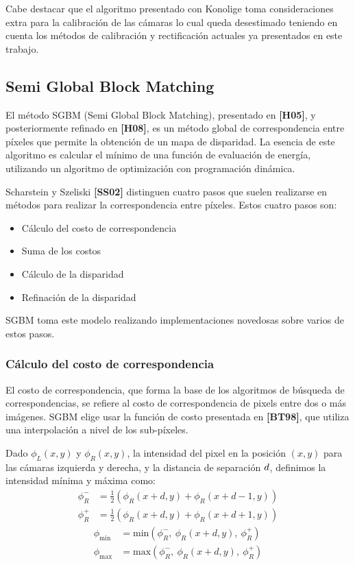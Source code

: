 \documentclass[11pt,a4paper,titlepage]{article}
\newcommand{\Cite}[1]{\textbf{[#1]}}
\newcommand{\Scalar}[1]{\ensuremath{\mathnormal{#1}}}
\begin{document}
Cabe destacar que el algoritmo presentado con Konolige toma consideraciones extra para la calibración de las cámaras lo cual queda desestimado teniendo en cuenta los métodos de calibración y rectificación actuales ya presentados en este trabajo.

\subsection{Semi Global Block Matching}

El método SGBM (Semi Global Block Matching), presentado en \Cite{H05}, y posteriormente refinado en \Cite{H08}, es un método global de correspondencia entre píxeles que permite la obtención de un mapa de disparidad. La esencia de este algoritmo es calcular el mínimo de una función de evaluación de energía, utilizando un algoritmo de optimización con programación dinámica.

Scharstein y Szeliski \Cite{SS02} distinguen cuatro pasos que suelen realizarse en métodos para realizar la correspondencia entre píxeles. Estos cuatro pasos son:
\begin{itemize}
	\item Cálculo del costo de correspondencia
	\item Suma de los costos
	\item Cálculo de la disparidad
	\item Refinación de la disparidad
\end{itemize}

SGBM toma este modelo realizando implementaciones novedosas sobre varios de estos pasos.

\subsubsection{Cálculo del costo de correspondencia}

El costo de correspondencia, que forma la base de los algoritmos de búsqueda de correspondencias, se refiere al costo de correspondencia de pixels entre dos o más imágenes. SGBM elige usar la función de costo presentada en \Cite{BT98}, que utiliza una interpolación a nivel de los sub-píxeles.

Dado $\phi_L(x, y)$ y $\phi_R(x, y)$, la intensidad del pixel en la posición $(x, y)$ para las cámaras izquierda y derecha, y la distancia de separación \Scalar{d}, definimos la intensidad mínima y máxima como:
\begin{align*}
	\phi_R^- &= \frac{1}{2} \left( \phi_R( x + d, y ) + \phi_R( x + d - 1, y ) \right ) \\
	\phi_R^+ &= \frac{1}{2} \left( \phi_R( x + d, y ) + \phi_R( x + d + 1, y ) \right )
\end{align*}
\begin{align*}
	\phi_\mathrm{min} &= \mathrm{min} \left( \phi_R^-,\ \phi_R( x + d, y ),\ \phi_R^+ \right ) \\
	\phi_\mathrm{max} &= \mathrm{max} \left( \phi_R^-,\ \phi_R( x + d, y ),\ \phi_R^+ \right )
\end{align*}
\end{document}
